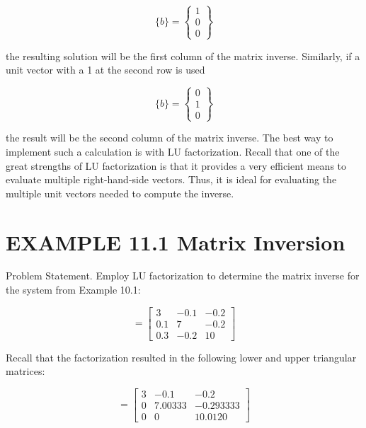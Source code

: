 \documentclass[../main.tex]{subfiles}
\begin{document}
\begin{equation}
\{b\}=
\begin{Bmatrix}
1\\ 
0\\ 
0
\end{Bmatrix}
\tag{11.2}
\end{equation}

the resulting solution will be the first column of the matrix inverse. Similarly, if a unit vector with a 1 at the second row is used

\begin{equation}
\{b\}=
\begin{Bmatrix}
0\\ 
1\\ 
0
\end{Bmatrix}
\tag{11.3}
\end{equation}

the result will be the second column of the matrix inverse.
The best way to implement such a calculation is with LU factorization. Recall that one
of the great strengths of LU factorization is that it provides a very efficient means to evaluate multiple right-hand-side vectors.
Thus, it is ideal for evaluating the multiple unit vectors needed to compute the inverse.

\section*{EXAMPLE 11.1 Matrix Inversion}

Problem Statement. Employ LU factorization to determine the matrix inverse for the system from Example 10.1:

\begin{equation}
[A]=
\begin{bmatrix}
3 & -0.1 & -0.2 \\
0.1 & 7 & -0.2 \\
0.3 & -0.2 & 10
\end{bmatrix}
\end{equation}

Recall that the factorization resulted in the following lower and upper triangular matrices:

\begin{equation}
[U]=
\begin{bmatrix}
3 & -0.1 & -0.2 \\
0 & 7.00333 & -0.293333 \\
0 & 0 & 10.0120
\end{bmatrix}
\end{equation}
\end{document}
